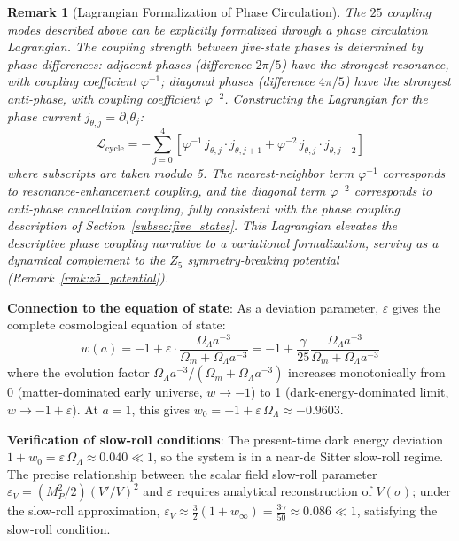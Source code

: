 \documentclass[12pt,a4paper,twocolumn]{article}
\renewcommand{\phi}{\varphi}
\newtheorem{remark}[theorem]{Remark}
\begin{document}
\begin{remark}[Lagrangian Formalization of Phase Circulation]
\label{rmk:phase_circulation}
The $25$ coupling modes described above can be explicitly formalized through a phase circulation Lagrangian. The coupling strength between five-state phases is determined by phase differences: adjacent phases (difference $2\pi/5$) have the strongest resonance, with coupling coefficient $\phi^{-1}$; diagonal phases (difference $4\pi/5$) have the strongest anti-phase, with coupling coefficient $\phi^{-2}$. Constructing the Lagrangian for the phase current $j_{\theta,j} = \partial_\tau\theta_j$:
\begin{equation}
\mathcal{L}_{\text{cycle}} = -\sum_{j=0}^{4} \left[ \phi^{-1}\, j_{\theta,j} \cdot j_{\theta,j+1} + \phi^{-2}\, j_{\theta,j} \cdot j_{\theta,j+2} \right]
\end{equation}
where subscripts are taken modulo 5. The nearest-neighbor term $\phi^{-1}$ corresponds to resonance-enhancement coupling, and the diagonal term $\phi^{-2}$ corresponds to anti-phase cancellation coupling, fully consistent with the phase coupling description of Section~\ref{subsec:five_states}. This Lagrangian elevates the descriptive phase coupling narrative to a variational formalization, serving as a dynamical complement to the $Z_5$ symmetry-breaking potential (Remark~\ref{rmk:z5_potential}).
\end{remark}

\textbf{Connection to the equation of state}: As a deviation parameter, $\varepsilon$ gives the complete cosmological equation of state:
\[
w(a) = -1 + \varepsilon \cdot \frac{\Omega_\Lambda a^{-3}}{\Omega_m + \Omega_\Lambda a^{-3}} = -1 + \frac{\gamma}{25}\frac{\Omega_\Lambda a^{-3}}{\Omega_m + \Omega_\Lambda a^{-3}}
\]
where the evolution factor $\Omega_\Lambda a^{-3}/(\Omega_m + \Omega_\Lambda a^{-3})$ increases monotonically from 0 (matter-dominated early universe, $w\to -1$) to 1 (dark-energy-dominated limit, $w\to -1+\varepsilon$). At $a=1$, this gives $w_0 = -1 + \varepsilon\,\Omega_\Lambda \approx -0.9603$.

\textbf{Verification of slow-roll conditions}: The present-time dark energy deviation $1+w_0 = \varepsilon\,\Omega_\Lambda \approx 0.040 \ll 1$, so the system is in a near-de Sitter slow-roll regime. The precise relationship between the scalar field slow-roll parameter $\varepsilon_V = (M_P^2/2)(V'/V)^2$ and $\varepsilon$ requires analytical reconstruction of $V(\sigma)$; under the slow-roll approximation, $\varepsilon_V \approx \frac{3}{2}(1+w_\infty) = \frac{3\gamma}{50} \approx 0.086 \ll 1$, satisfying the slow-roll condition.
\end{document}
